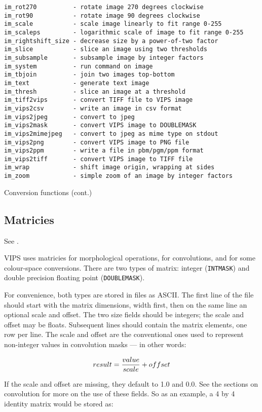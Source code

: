 \begin{fig2}
\begin{verbatim}
im_rot270          - rotate image 270 degrees clockwise
im_rot90           - rotate image 90 degrees clockwise
im_scale           - scale image linearly to fit range 0-255
im_scaleps         - logarithmic scale of image to fit range 0-255
im_rightshift_size - decrease size by a power-of-two factor
im_slice           - slice an image using two thresholds
im_subsample       - subsample image by integer factors
im_system          - run command on image
im_tbjoin          - join two images top-bottom
im_text            - generate text image
im_thresh          - slice an image at a threshold
im_tiff2vips       - convert TIFF file to VIPS image
im_vips2csv        - write an image in csv format
im_vips2jpeg       - convert to jpeg
im_vips2mask       - convert VIPS image to DOUBLEMASK
im_vips2mimejpeg   - convert to jpeg as mime type on stdout
im_vips2png        - convert VIPS image to PNG file
im_vips2ppm        - write a file in pbm/pgm/ppm format
im_vips2tiff       - convert VIPS image to TIFF file
im_wrap            - shift image origin, wrapping at sides
im_zoom            - simple zoom of an image by integer factors
\end{verbatim}
\caption{Conversion functions (cont.)}
\end{fig2}

\subsection{Matricies}

See .

VIPS uses matricies for morphological operations, for convolutions, and
for some colour-space conversions. There are two types of matrix: integer
(\verb+INTMASK+) and double precision floating point (\verb+DOUBLEMASK+).

For convenience, both types are stored in files as ASCII. The first
line of the file should start with the matrix dimensions, width first,
then on the same line an optional scale and offset. The two size fields
should be integers; the scale and offset may be floats. Subsequent lines
should contain the matrix elements, one row per line.  The scale and
offset are the conventional ones used to represent non-integer values in
convolution masks --- in other words:

\[
result = {value \over scale} + offset
\]

If the scale and offset are missing, they default to 1.0 and 0.0.  See the
sections on convolution for more on the use of these fields. So as an example,
a 4 by 4 identity matrix would be stored as:

